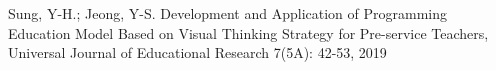\documentclass[
12pt,		%
openright,	%
twoside,  %
a4paper,			%
chapter=TITLE,		%
english,			%
french,				%
spanish,			%
brazil				%
]{USPSC-classe/USPSC}
\begin{document}
\begin{flushleft}
\begin{flushleft}
\begin{flushleft}
\begin{flushleft}
\begin{flushleft}
\begin{flushleft}
\begin{flushleft}
\begin{flushleft}
\begin{flushleft}
\begin{flushleft}
[SUNG, 2019] Sung, Y-H.; Jeong, Y-S. Development and Application of Programming Education Model Based on Visual Thinking Strategy for Pre-service Teachers, Universal Journal of Educational Research 7(5A): 42-53, 2019
\end{flushleft}


\end{flushleft}


\end{flushleft}


\end{flushleft}


\end{flushleft}


\end{flushleft}


\end{flushleft}


\end{flushleft}


\end{flushleft}


\end{flushleft}
\end{document}
